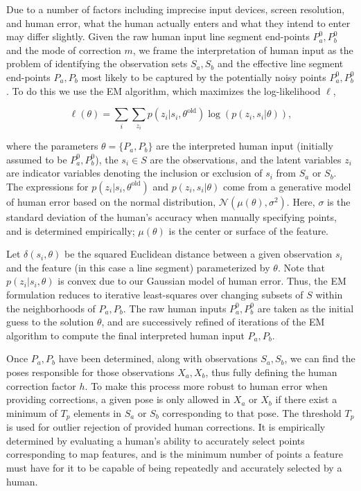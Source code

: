 \documentclass[letterpaper]{article} %
\theoremstyle{definition}
\begin{document}
Due to a number of factors including imprecise input devices, screen
resolution, and human error, what the human actually enters and what they
intend to enter may differ slightly. Given the raw human input line segment
end-points $P_a ^0,P_b ^0$ and the mode of correction $m$, we frame the
interpretation of human input as the problem of identifying the observation
sets $S_a, S_b$ and the effective line segment end-points $P_a, P_b$ most
likely to be captured by the potentially noisy points $P_a ^0,P_b ^0$.
 To do this we use the EM algorithm, which maximizes the
log-likelihood $\ell$,

\begin{equation*}
\ell(\theta) = \sum_i \sum_{z_i} p(z_i | s_i , \theta^{\text{old}}) \log(p(z_i , s_i | \theta )),
\end{equation*}

\noindent where the parameters $\theta = \{ P_a, P_b \}$ are the
interpreted human input (initially assumed to be  $P_a ^0,P_b ^0$), the $s_i
\in S$ are the observations, and the latent variables $z_i$ are indicator
variables denoting the inclusion or exclusion of $s_i$ from $S_a$ or $S_b$. The
expressions for $p(z_i | s_i , \theta^{\text{old}})$ and $p(z_i , s_i | \theta
)$ come from a generative model of human error based on the normal
distribution, $\mathcal{N}(\mu(\theta), \sigma^2)$. Here, $\sigma$ is the
standard deviation of the human's accuracy when manually specifying points, and
is determined empirically; $\mu(\theta)$ is the center or surface of the
feature.

Let $\delta(s_i, \theta)$ be the squared Euclidean distance between a given
observation $s_i$ and the feature (in this case a line segment) parameterized by
$\theta$. Note that $p(z_i | s_i, \theta)$ is convex due to our Gaussian model
of human error. Thus, the EM formulation reduces to iterative least-squares over
changing subsets of $S$ within the neighborhoods of $P_a, P_b$. The raw human
inputs $P_a ^0,P_b ^0$ are taken as the initial guess to the solution $\theta$,
and are successively refined of iterations of the EM algorithm to compute the
final interpreted human input  $P_a,P_b$.

Once $P_a, P_b$ have been determined, along with observations $S_a, S_b$, we can
find the poses responsible for those observations $X_a, X_b$, thus fully
defining the human correction factor $h$. To make this process more robust to
human error when providing corrections, a given pose is only allowed in $X_a$ or
$X_b$ if there exist a minimum of $T_p$ elements in $S_a$ or $S_b$ corresponding
to that pose. The threshold $T_p$ is used for outlier rejection of provided
human corrections. It is empirically determined by evaluating a human's ability
to accurately select points corresponding to map features, and is the minimum
number of points a feature must have for it to be capable of being repeatedly
and accurately selected by a human.
\end{document}
